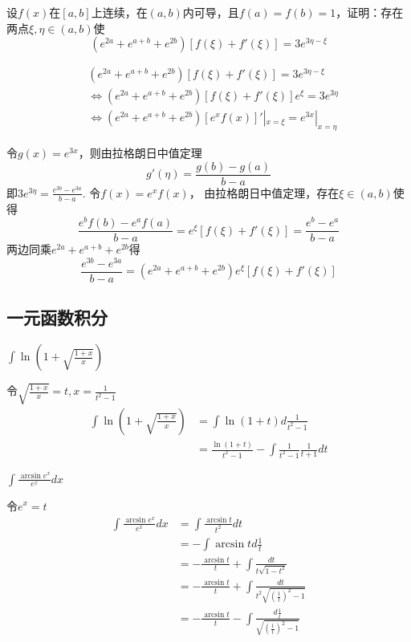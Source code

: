 \documentclass{article}
\begin{document}
\begin{examplle}[]
设\(f(x)\)在\([a,b]\)上连续，在\((a,b)\)内可导，且\(f(a)=f(b)=1\)，证明：存在
两点\(\xi,\eta\in(a,b)\)使
\begin{equation*}
(e^{2a}+e^{a+b}+e^{2b})[f(\xi)+f'(\xi)]=3e^{3\eta-\xi}
\end{equation*}


\begin{align*}
&(e^{2a}+e^{a+b}+e^{2b})[f(\xi)+f'(\xi)]=3e^{3\eta-\xi}\\
&\Leftrightarrow (e^{2a}+e^{a+b}+e^{2b})[f(\xi)+f'(\xi)]e^{\xi}=3e^{3\eta}\\
&\Leftrightarrow(e^{2a}+e^{a+b}+e^{2b})[e^xf(x)]'|_{x=\xi}=
e^{3x}|_{x=\eta}
\end{align*}

令\(g(x)=e^{3x}\)，则由拉格朗日中值定理
\begin{equation*}
g'(\eta)=\frac{g(b)-g(a)}{b-a}
\end{equation*}
即\(\displaystyle  3e^{3\eta}=\frac{e^{3b}-e^{3a}}{b-a}\). 令\(f(x)=e^xf(x)\)，
由拉格朗日中值定理，存在\(\xi\in(a,b)\)使得
\begin{equation*}
\frac{e^bf(b)-e^af(a)}{b-a}=e^{\xi}[f(\xi)+f'(\xi)]=\frac{e^b-e^a}{b-a}
\end{equation*}
两边同乘\(e^{2a}+e^{a+b}+e^{2b}\)得
\begin{equation*}
\frac{e^{3b}-e^{3a}}{b-a}=(e^{2a}+e^{a+b}+e^{2b})e^{\xi}[f(\xi)+f'(\xi)]
\end{equation*}
\end{examplle}
\subsection{一元函数积分}
\label{sec:orgaa55629}
\begin{examplle}[]
\(\displaystyle\int\ln(1+\sqrt{\frac{1+x}{x}})\)

令\(\displaystyle\sqrt{\frac{1+x}{x}}=t,x=\frac{1}{t^2-1}\)
\begin{align*}
\int\ln(1+\sqrt{\frac{1+x}{x}})&=
\int\ln(1+t)d\frac{1}{t^2-1}\\
&=\frac{\ln(1+t)}{t^2-1}-\int\frac{1}{t^2-1}\frac{1}{t+1}dt
\end{align*}
\end{examplle}

\begin{examplle}[]
\(\displaystyle\int\frac{\arcsin e^x}{e^x}dx\)

令\(e^x=t\)
\begin{align*}
\int\frac{\arcsin e^x}{e^x}dx&=
\int\frac{\arcsin t}{t^2}dt\\
&=-\int\arcsin td\frac{1}{t}\\
&=-\frac{\arcsin t}{t}+\int\frac{dt}{t\sqrt{1-t^2}}\\
&=-\frac{\arcsin t}{t}+\int\frac{dt}{t^2\sqrt{(\frac{1}{t})^2-1}}\\
&=-\frac{\arcsin t}{t}-\int\frac{d\frac{1}{t}}{\sqrt{(\frac{1}{t})^2-1}}
\end{align*}
\end{examplle}
\end{document}
